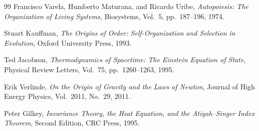 \documentclass[12pt,a4paper]{article}
\begin{document}
\begin{thebibliography}{99}
Francisco Varela, Humberto Maturana, and Ricardo Uribe,
\textit{Autopoiesis: The Organization of Living Systems},
Biosystems, Vol.~5, pp.~187--196, 1974.

Stuart Kauffman,
\textit{The Origins of Order: Self-Organization and Selection in Evolution},
Oxford University Press, 1993.

Ted Jacobson,
\textit{Thermodynamics of Spacetime: The Einstein Equation of State},
Physical Review Letters, Vol.~75, pp.~1260--1263, 1995.

Erik Verlinde,
\textit{On the Origin of Gravity and the Laws of Newton},
Journal of High Energy Physics, Vol.~2011, No.~29, 2011.

Peter Gilkey,
\textit{Invariance Theory, the Heat Equation, and the Atiyah--Singer Index Theorem},
Second Edition, CRC Press, 1995.

\end{thebibliography}
\end{document}
